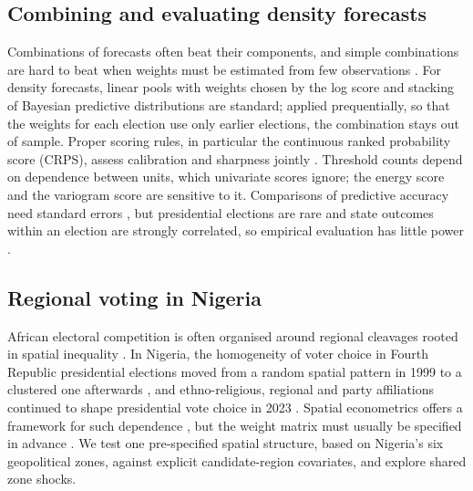 \documentclass[preprint,12pt,authoryear]{elsarticle}
\begin{document}
\subsection{Combining and evaluating density forecasts}
Combinations of forecasts often beat their components, and simple combinations are hard to beat when weights must be estimated from few observations \citep{Claeskens2016Puzzle, Wang2023Combination}. For density forecasts, linear pools with weights chosen by the log score \citep{HallMitchell2007, GewekeAmisano2011} and stacking of Bayesian predictive distributions \citep{Yao2018UsingStacking} are standard; applied prequentially, so that the weights for each election use only earlier elections, the combination stays out of sample. Proper scoring rules, in particular the continuous ranked probability score (CRPS), assess calibration and sharpness jointly \citep{Gneiting2007StrictlyProper, Matheson1976ScoringRules, Gneiting2007Sharpness, Jordan2019EvaluatingProbabilistic}. Threshold counts depend on dependence between units, which univariate scores ignore; the energy score \citep{Gneiting2008Multivariate} and the variogram score \citep{ScheuererHamill2015} are sensitive to it. Comparisons of predictive accuracy need standard errors \citep{DieboldMariano1995}, but presidential elections are rare and state outcomes within an election are strongly correlated, so empirical evaluation has little power \citep{Grimmer2024AssessingReliability}.

\subsection{Regional voting in Nigeria}
African electoral competition is often organised around regional cleavages rooted in spatial inequality \citep{Boone2024InequalityPolitical, Boone2019RegionalInequalities}. In Nigeria, the homogeneity of voter choice in Fourth Republic presidential elections moved from a random spatial pattern in 1999 to a clustered one afterwards \citep{Nwankwo2019SpatialPattern}, and ethno-religious, regional and party affiliations continued to shape presidential vote choice in 2023 \citep{Abdulrazaq2024VotingPattern}. Spatial econometrics offers a framework for such dependence \citep{Lesage2009IntroductionSpatial}, but the weight matrix must usually be specified in advance \citep{Merk2021EstimationSpatial, Tan2024ParameterizingSpatial}. We test one pre-specified spatial structure, based on Nigeria's six geopolitical zones, against explicit candidate-region covariates, and explore shared zone shocks.
\end{document}
